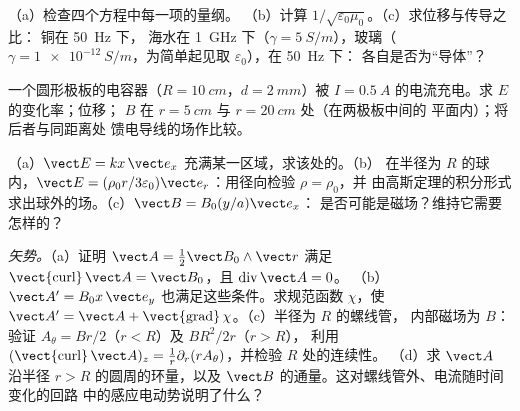 \begin{exercise}[$\star$]\label{exo:b2:maxwell-equations:2}
（a）检查四个方程中每一项的量纲。
（b）计算 $1/\sqrt{\varepsilon_0\mu_0}$。（c）求位移与传导之比：
铜在 \qty{50}{Hz} 下，
海水在 \qty{1}{GHz} 下（$\gamma = \qty{5}{S/m}$），玻璃（$\gamma =
\qty{1e-12}{S/m}$，为简单起见取 $\varepsilon_0$），在 \qty{50}{Hz} 下：
各自是否为“导体”？
\end{exercise}

\begin{exercise}[$\star$]\label{exo:b2:maxwell-equations:3}
一个圆形极板的电容器（$R = \qty{10}{cm}$，$d = \qty{2}{mm}$）被
$I = \qty{0.5}{A}$ 的电流充电。求 $E$ 的变化率；位移；
$B$ 在 $r = \qty{5}{cm}$ 与 $r = \qty{20}{cm}$ 处（在两极板中间的
平面内）；将后者与同距离处
馈电导线的场作比较。
\end{exercise}

\begin{exercise}[$\star$]\label{exo:b2:maxwell-equations:4}
（a）$\vect E = kx\,\vect e_x$ 充满某一区域，求该处的。（b）
在半径为 $R$ 的球内，$\vect E = (\rho_0r/3\varepsilon_0)\vect e_r$：用径向检验
$\rho = \rho_0$，并
由高斯定理的积分形式求出球外的场。（c）$\vect B = B_0(y/a)\vect e_x$：
是否可能是磁场？维持它需要怎样的？
\end{exercise}

\begin{exercise}[$\star\star$]\label{exo:b2:maxwell-equations:5}
\emph{矢势。}（a）证明 $\vect A = \tfrac12\vect B_0\wedge\vect r$
满足 $\operatorname{\vect{curl}}\vect A = \vect B_0$，且 $\operatorname{div}\vect A = 0$。
（b）$\vect A' = B_0x\,\vect e_y$ 也满足这些条件。求规范函数 $\chi$，使
$\vect A' = \vect A + \operatorname{\vect{grad}}\chi$。（c）半径为 $R$ 的螺线管，
内部磁场为 $B$：验证 $A_\theta = Br/2$（$r < R$）及 $BR^2/2r$（$r > R$），
利用 $(\operatorname{\vect{curl}}\vect A)_z = \frac1r\partial_r(rA_\theta)$，并检验 $R$ 处的连续性。
（d）求 $\vect A$ 沿半径 $r > R$ 的圆周的环量，以及
$\vect B$ 的通量。这对螺线管外、电流随时间变化的回路
中的感应电动势说明了什么？
\end{exercise}

